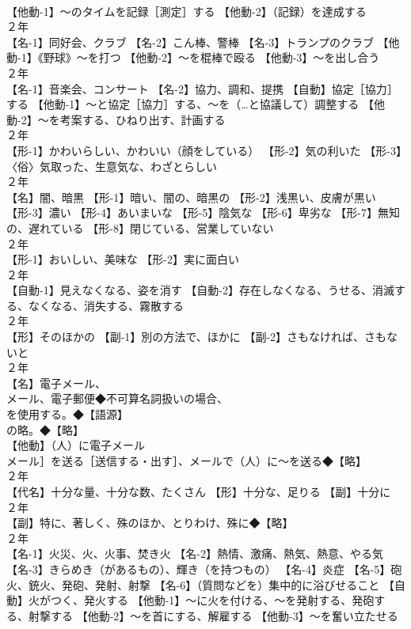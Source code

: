 \documentclass[8pt]{extreport}
\begin{document}
\begin{CJK}{UTF8}{min}
\\	【他動-1】～のタイムを記録［測定］する 【他動-2】（記録）を達成する
\\	２年	
\\	【名-1】同好会、クラブ 【名-2】こん棒、警棒 【名-3】トランプのクラブ 【他動-1】《野球》～を打つ 【他動-2】～を棍棒で殴る 【他動-3】～を出し合う
\\	２年	
\\	【名-1】音楽会、コンサート 【名-2】協力、調和、提携 【自動】協定［協力］する 【他動-1】～と協定［協力］する、～を（…と協議して）調整する 【他動-2】～を考案する、ひねり出す、計画する
\\	２年	
\\	【形-1】かわいらしい、かわいい（顔をしている） 【形-2】気の利いた 【形-3】〈俗〉気取った、生意気な、わざとらしい
\\	２年	
\\	【名】闇、暗黒 【形-1】暗い、闇の、暗黒の 【形-2】浅黒い、皮膚が黒い 【形-3】濃い 【形-4】あいまいな 【形-5】陰気な 【形-6】卑劣な 【形-7】無知の、遅れている 【形-8】閉じている、営業していない
\\	２年	
\\	【形-1】おいしい、美味な 【形-2】実に面白い
\\	２年	
\\	【自動-1】見えなくなる、姿を消す 【自動-2】存在しなくなる、うせる、消滅する、なくなる、消失する、霧散する
\\	２年	
\\	【形】そのほかの 【副-1】別の方法で、ほかに 【副-2】さもなければ、さもないと
\\	２年	
\\	【名】電子メール、
\\	メール、電子郵便◆不可算名詞扱いの場合、
\\	を使用する。◆【語源】
\\	の略。◆【略】
\\	【他動】（人）に電子メール
\\	メール］を送る［送信する・出す］、メールで（人）に～を送る◆【略】
\\	２年	
\\	【代名】十分な量、十分な数、たくさん 【形】十分な、足りる 【副】十分に
\\	２年	
\\	【副】特に、著しく、殊のほか、とりわけ、殊に◆【略】
\\	２年	
\\	【名-1】火災、火、火事、焚き火 【名-2】熱情、激痛、熱気、熱意、やる気 【名-3】きらめき（があるもの）、輝き（を持つもの） 【名-4】炎症 【名-5】砲火、銃火、発砲、発射、射撃 【名-6】（質問などを）集中的に浴びせること 【自動】火がつく、発火する 【他動-1】～に火を付ける、～を発射する、発砲する、射撃する 【他動-2】～を首にする、解雇する 【他動-3】～を奮い立たせる

\end{CJK}
\end{document}
